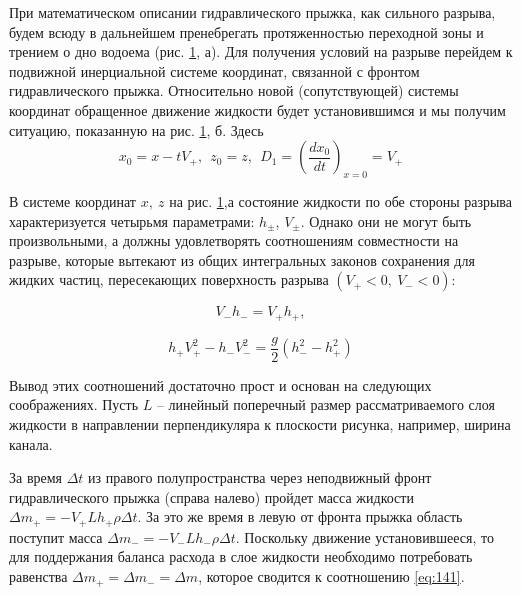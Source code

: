 \documentclass[specialist, subf, href, colorlinks=true, 14pt, final]{disser}
\theoremstyle{definition}
\begin{document}
При математическом описании гидравлического прыжка, как сильного разрыва, будем всюду в дальнейшем пренебрегать протяженностью переходной зоны и трением о дно водоема (рис. \ref{1-4-2}, а). Для получения условий на разрыве перейдем к подвижной инерциальной системе координат, связанной с фронтом гидравлического прыжка. Относительно новой (сопутствующей) системы координат обращенное движение жидкости будет установившимся и мы получим ситуацию, показанную на рис. \ref{1-4-2}, б. Здесь
\[
  x_{0} = x-tV_{+},\ \ z_{0}=z,\ \ D_{1} = \left(\frac{dx_0}{dt}\right)_{x=0} = V_{+}
\]
\newpage
\begin{figure}[!htp]
  \caption{}
  \label{1-4-2}
\end{figure}

В системе координат $x,\ z$ на рис. \ref{1-4-2},а состояние жидкости по обе стороны разрыва характеризуется четырьмя параметрами: $h_{\pm}$, $V_{\pm}$. Однако они не могут быть произвольными, а должны удовлетворять соотношениям совместности на разрыве, которые вытекают из общих интегральных законов сохранения для жидких частиц, пересекающих поверхность разрыва $(V_{+}<0,\ V_{-}<0)$:
\addtocounter{equation}{1}
\begin{equation}\label{eq:141}
  V_{-}h_{-} = V_{+}h_{+},
  \tag{1}
\end{equation}
\addtocounter{equation}{1}
\begin{equation}\label{eq:142}
  h_{+}V_{+}^{2} - h_{-}V_{-}^{2} = \frac{g}{2}(h_{-}^{2} - h_{+}^{2})
  \tag{2}
\end{equation}

Вывод этих соотношений достаточно прост и основан на следующих соображениях. Пусть $L$ -- линейный поперечный размер рассматриваемого слоя жидкости в направлении перпендикуляра к плоскости рисунка, например, ширина канала.

За время $\Delta t$ из правого полупространства через неподвижный фронт гидравлического прыжка (справа налево) пройдет масса жидкости $\Delta m_{+} = -V_{+}Lh_{+}\rho \Delta t$. За это же время в левую от фронта прыжка область поступит масса $\Delta m_{-} = -V_{-}Lh_{-}\rho \Delta t$. Поскольку движение установившееся, то для поддержания баланса расхода в слое жидкости необходимо потребовать равенства $\Delta m_{+} = \Delta m_{-} = \Delta m$, которое сводится к соотношению \eqref{eq:141}.
\end{document}
